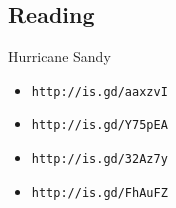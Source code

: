 \documentclass[xga]{xdvislides}
\begin{document}
% 
% 

\subsection{Reading}
Hurricane Sandy
\begin{itemize}
	\item \verb+http://is.gd/aaxzvI+
	\item \verb+http://is.gd/Y75pEA+
	\item \verb+http://is.gd/32Az7y+
	\item \verb+http://is.gd/FhAuFZ+
\end{itemize}
\end{document}
